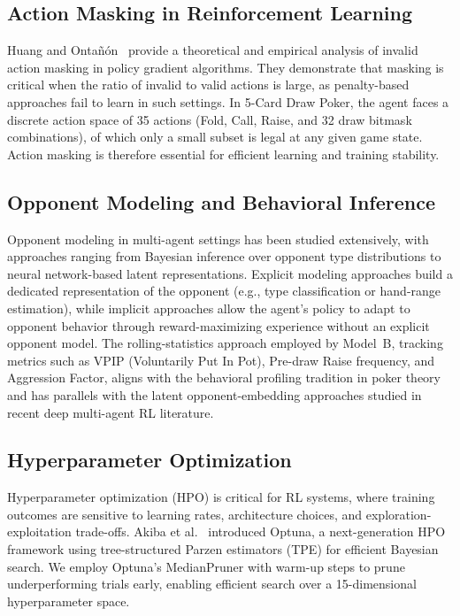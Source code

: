 \documentclass[conference]{IEEEtran}
\begin{document}
\subsection{Action Masking in Reinforcement Learning}

Huang and Onta\~{n}{\'o}n~\cite{huang2022closer} provide a
theoretical and empirical analysis of invalid action masking in policy
gradient algorithms. They demonstrate that masking is critical when
the ratio of invalid to valid actions is large, as penalty-based
approaches fail to learn in such settings. In 5-Card Draw Poker,
the agent faces a discrete action space of 35 actions (Fold, Call,
Raise, and 32 draw bitmask combinations), of which only a small
subset is legal at any given game state. Action masking is therefore
essential for efficient learning and training stability.

\subsection{Opponent Modeling and Behavioral Inference}

Opponent modeling in multi-agent settings has been studied
extensively, with approaches ranging from Bayesian inference over
opponent type distributions to neural network-based latent
representations. Explicit modeling approaches
build a dedicated representation of the opponent (e.g., type
classification or hand-range estimation), while implicit approaches
allow the agent's policy to adapt to opponent behavior through
reward-maximizing experience without an explicit opponent model. The
rolling-statistics approach employed by Model~B, tracking metrics
such as VPIP (Voluntarily Put In Pot), Pre-draw Raise frequency, and
Aggression Factor, aligns with the behavioral profiling tradition in
poker theory and has parallels with the latent opponent-embedding
approaches studied in recent deep multi-agent RL literature.

\subsection{Hyperparameter Optimization}

Hyperparameter optimization (HPO) is critical for RL systems, where
training outcomes are sensitive to learning rates, architecture
choices, and exploration-exploitation trade-offs. Akiba et
al.~\cite{akiba2019optuna} introduced Optuna, a next-generation HPO
framework using tree-structured Parzen estimators (TPE) for efficient
Bayesian search. We employ Optuna's MedianPruner with warm-up steps
to prune underperforming trials early, enabling efficient search over
a 15-dimensional hyperparameter space.
\end{document}
